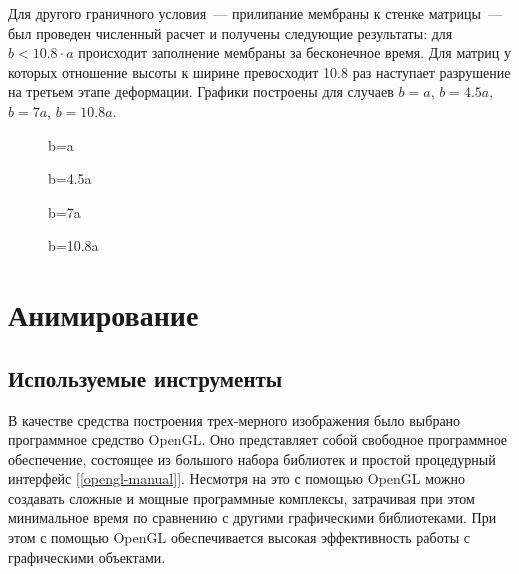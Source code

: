 Для другого граничного условия~--- прилипание мембраны к стенке матрицы~--- был проведен численный расчет и получены следующие результаты:
для \linebreak$b<10.8\cdot a$ происходит заполнение мембраны за бесконечное время. Для матриц у которых отношение высоты к ширине превосходит
10.8 раз наступает разрушение на третьем этапе деформации. Графики построены для случаев $b=a$, $b=4.5a$, $b=7a$, $b=10.8a$.
 
						 
		\begin{figure}[h!]	
				\def\svgwidth{\columnwidth}
				\caption{b=a} 
				\label{vert_stick_ba}
		\end{figure}

		\begin{figure}[h!]	
				\def\svgwidth{\columnwidth}
				\caption{b=4.5a} 
				\label{vert_stick_4ba}
		\end{figure}
				\begin{figure}[h!]	
				\def\svgwidth{\columnwidth}
				\caption{b=7a} 
				\label{vert_stick_7ba}
		\end{figure}
				\begin{figure}[h!]	
				\def\svgwidth{\columnwidth}
				\caption{b=10.8a} 
				\label{vert_stick_10ba}
		\end{figure}

\clearpage

\section{Анимирование}
\subsection{Используемые инструменты}
В качестве средства построения трех-мерного изображения было выбрано программное 
средство OpenGL. Оно представляет собой свободное программное обеспечение, состоящее 
из большого набора библиотек и простой процедурный интерфейс [\ref{opengl-manual}]. 
Несмотря на это с  помощью OpenGL можно создавать сложные и мощные программные 
комплексы, затрачивая при 
этом минимальное время по сравнению с другими графическими библиотеками. При этом с 
помощью OpenGL обеспечивается высокая эффективность работы с графическими объектами.
